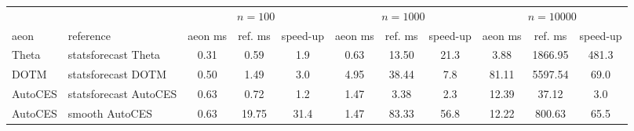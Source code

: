 \begin{tabular}{llccccccccc}
\toprule
 & & \multicolumn{3}{c}{$n=100$} & \multicolumn{3}{c}{$n=1000$} & \multicolumn{3}{c}{$n=10000$} \\
aeon & reference & aeon ms & ref. ms & speed-up & aeon ms & ref. ms & speed-up & aeon ms & ref. ms & speed-up \\
\midrule
Theta & statsforecast Theta & 0.31 & 0.59 & 1.9 & 0.63 & 13.50 & 21.3 & 3.88 & 1866.95 & 481.3 \\
DOTM & statsforecast DOTM & 0.50 & 1.49 & 3.0 & 4.95 & 38.44 & 7.8 & 81.11 & 5597.54 & 69.0 \\
AutoCES & statsforecast AutoCES & 0.63 & 0.72 & 1.2 & 1.47 & 3.38 & 2.3 & 12.39 & 37.12 & 3.0 \\
AutoCES & smooth AutoCES & 0.63 & 19.75 & 31.4 & 1.47 & 83.33 & 56.8 & 12.22 & 800.63 & 65.5 \\
\bottomrule
\end{tabular}
